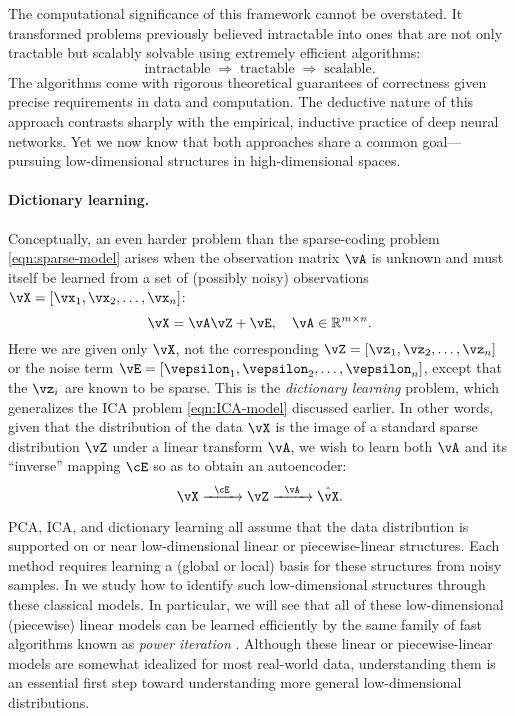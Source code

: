 \documentclass[../../book-main.tex]{subfiles}
\begin{document}
The computational significance of this framework cannot be overstated. It transformed problems previously believed intractable into ones that are not only tractable but scalably solvable using extremely efficient algorithms:
\begin{equation}
    \text{intractable} \;\Longrightarrow\; \text{tractable} \;\Longrightarrow\; \text{scalable}.
\end{equation}
The algorithms come with rigorous theoretical guarantees of correctness given precise requirements in data and computation. The deductive nature of this approach contrasts sharply with the empirical, inductive practice of deep neural networks. Yet we now know that both approaches share a common goal---pursuing low-dimensional structures in high-dimensional spaces.

\paragraph{Dictionary learning.}
Conceptually, an even harder problem than the sparse-coding problem \eqref{eqn:sparse-model} arises when the observation matrix \(\vA\) is unknown and must itself be learned from a set of (possibly noisy) observations \(\vX = [\vx_{1}, \vx_{2}, \ldots, \vx_{n}]\):
\begin{equation}
    \vX = \vA \vZ + \vE, \quad \vA \in \R^{m\times n}.
    \label{eqn:dictionary-learning}
\end{equation}
Here we are given only \(\vX\), not the corresponding \(\vZ = [\vz_{1}, \vz_{2}, \ldots, \vz_{n}]\) or the noise term \(\vE = [\vepsilon_{1}, \vepsilon_{2}, \ldots, \vepsilon_{n}]\), except that the \(\vz_{i}\) are known to be sparse. This is the \textit{dictionary learning} problem, which generalizes the ICA problem \eqref{eqn:ICA-model} discussed earlier. In other words, given that the distribution of the data \(\vX\) is the image of a standard sparse distribution \(\vZ\) under a linear transform \(\vA\), we wish to learn both \(\vA\) and its ``inverse'' mapping \(\cE\) so as to obtain an autoencoder:
\begin{equation}
    \vX   \xrightarrow{\hspace{2mm} \cE\hspace{2mm}}  \vZ \xrightarrow{\hspace{2mm} \vA \hspace{2mm}} \hat{\vX}.
       \label{eqn:decoding-DL}
\end{equation}

PCA, ICA, and dictionary learning all assume that the data distribution is supported on or near low-dimensional linear or piecewise-linear structures. Each method requires learning a (global or local) basis for these structures from noisy samples. In  we study how to identify such low-dimensional structures through these classical models. In particular, we will see that all of these low-dimensional (piecewise) linear models can be learned efficiently by the same family of fast algorithms known as \textit{power iteration} \cite{Zhai-2020}. Although these linear or piecewise-linear models are somewhat idealized for most real-world data, understanding them is an essential first step toward understanding more general low-dimensional distributions.
\end{document}

